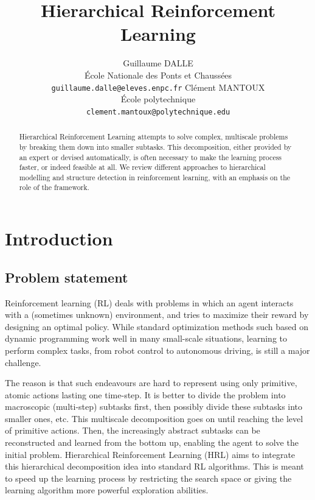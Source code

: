 \documentclass{article}
\title{Hierarchical Reinforcement Learning}
\author{%
  Guillaume DALLE \\
  École Nationale des Ponts et Chaussées \\
  \texttt{guillaume.dalle@eleves.enpc.fr} 
  \And
  Clément MANTOUX \\
  École polytechnique \\
  \texttt{clement.mantoux@polytechnique.edu}
}
\begin{document}

\maketitle

\begin{abstract}

Hierarchical Reinforcement Learning attempts to solve complex, multiscale problems by breaking them down into smaller subtasks. This decomposition, either provided by an expert or devised automatically, is often necessary to make the learning process faster, or indeed feasible at all. We review different approaches to hierarchical modelling and structure detection in reinforcement learning, with an emphasis on the role of the framework.

\end{abstract}

\section{Introduction}  \label{intro}

\subsection{Problem statement}

Reinforcement learning (RL) deals with problems in which an agent interacts with a (sometimes unknown) environment, and tries to maximize their reward by designing an optimal policy. While standard optimization methods such based on dynamic programming work well in many small-scale situations, learning to perform complex tasks, from robot control to autonomous driving, is still a major challenge.

The reason is that such endeavours are hard to represent using only primitive, atomic actions lasting one time-step. It is better to divide the problem into macroscopic (multi-step) subtasks first, then possibly divide these subtasks into smaller ones, etc.  This multiscale decomposition goes on until reaching the level of primitive actions. Then, the increasingly abstract subtasks can be reconstructed and learned from the bottom up, enabling the agent to solve the initial problem. 
Hierarchical Reinforcement Learning (HRL) aims to integrate this hierarchical decomposition idea into standard RL algorithms. This is meant to speed up the learning process by restricting the search space or giving the learning algorithm more powerful exploration abilities. 
\end{document}
